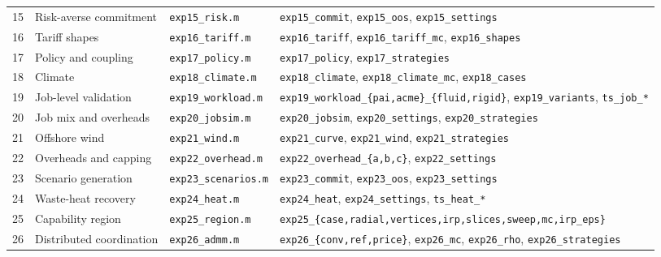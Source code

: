 \begin{table}[!t]
\begin{tabularx}{\textwidth}{@{}c>{\raggedright\arraybackslash}p{}>{\raggedright\arraybackslash}p{}X@{}}
15 & Risk-averse commitment & \texttt{exp15\_risk.m} & \texttt{exp15\_commit}, \texttt{exp15\_oos}, \texttt{exp15\_settings}\\
16 & Tariff shapes & \texttt{exp16\_tariff.m} & \texttt{exp16\_tariff}, \texttt{exp16\_tariff\_mc}, \texttt{exp16\_shapes}\\
17 & Policy and coupling & \texttt{exp17\_policy.m} & \texttt{exp17\_policy}, \texttt{exp17\_strategies}\\
18 & Climate & \texttt{exp18\_climate.m} & \texttt{exp18\_climate}, \texttt{exp18\_climate\_mc}, \texttt{exp18\_cases}\\
19 & Job-level validation & \texttt{exp19\_workload.m} & \texttt{exp19\_workload\_\{pai,acme\}\_\{fluid,rigid\}}, \texttt{exp19\_variants}, \texttt{ts\_job\_*}\\
20 & Job mix and overheads & \texttt{exp20\_jobsim.m} & \texttt{exp20\_jobsim}, \texttt{exp20\_settings}, \texttt{exp20\_strategies}\\
21 & Offshore wind & \texttt{exp21\_wind.m} & \texttt{exp21\_curve}, \texttt{exp21\_wind}, \texttt{exp21\_strategies}\\
22 & Overheads and capping & \texttt{exp22\_overhead.m} & \texttt{exp22\_overhead\_\{a,b,c\}}, \texttt{exp22\_settings}\\
23 & Scenario generation & \texttt{exp23\_scenarios.m} & \texttt{exp23\_commit}, \texttt{exp23\_oos}, \texttt{exp23\_settings}\\
24 & Waste-heat recovery & \texttt{exp24\_heat.m} & \texttt{exp24\_heat}, \texttt{exp24\_settings}, \texttt{ts\_heat\_*}\\
25 & Capability region & \texttt{exp25\_region.m} & \texttt{exp25\_\{case,radial,vertices,irp,slices,sweep,mc,irp\_eps\}}\\
26 & Distributed coordination & \texttt{exp26\_admm.m} & \texttt{exp26\_\{conv,ref,price\}}, \texttt{exp26\_mc}, \texttt{exp26\_rho}, \texttt{exp26\_strategies}\\
\bottomrule
\end{tabularx}
\end{table}
